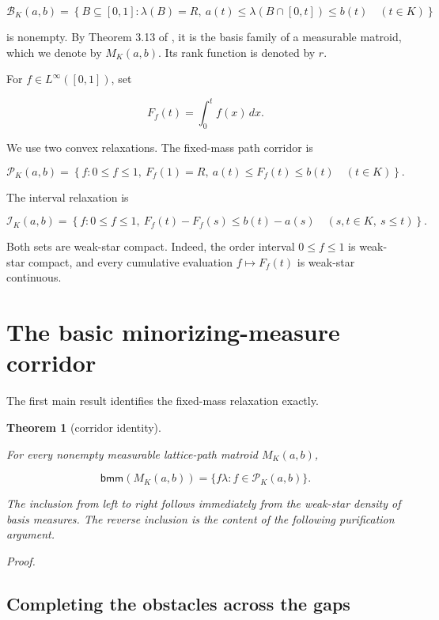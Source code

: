\documentclass[11pt]{article}
\newtheorem{theorem}{Theorem}[section]
\numberwithin{equation}{section}
\begin{document}
\nopagebreak[4]
\[
\mathcal B_K(a,b)
=\left\{B\subseteq[0,1]:
\lambda(B)=R,
\ a(t)\le\lambda(B\cap[0,t])\le b(t)\quad(t\in K)
\right\}
\]

is nonempty. By Theorem 3.13 of \cite{berczi2026}, it is the basis family of a measurable matroid,
which we denote by $M_K(a,b)$. Its rank function is denoted by $r$.

For $f\in L^\infty([0,1])$, set

\nopagebreak[4]
\[
F_f(t)=\int_0^t f(x)\,dx.
\]

We use two convex relaxations. The fixed-mass path corridor is

\nopagebreak[4]
\[
\mathcal P_K(a,b)
=\left\{f:
0\le f\le1,\ F_f(1)=R,
\ a(t)\le F_f(t)\le b(t)\quad(t\in K)
\right\}.
\]

The interval relaxation is

\nopagebreak[4]
\[
\mathcal I_K(a,b)
=\left\{f:
0\le f\le1,
\ F_f(t)-F_f(s)\le b(t)-a(s)
\quad(s,t\in K,\ s\le t)
\right\}.
\]

Both sets are weak-star compact. Indeed, the order interval $0\le f\le1$ is weak-star
compact, and every cumulative evaluation $f\mapsto F_f(t)$ is weak-star continuous.

\section{The basic minorizing-measure corridor}


The first main result identifies the fixed-mass relaxation exactly.

\begin{theorem}[corridor identity]
\label{thm:corridor}

For every nonempty measurable lattice-path matroid $M_K(a,b)$,

\nopagebreak[4]
\[
\mathsf{bmm}(M_K(a,b))
=\{f\lambda:f\in\mathcal P_K(a,b)\}.
\]

The inclusion from left to right follows immediately from the weak-star density of
basis measures. The reverse inclusion is the content of the following purification
argument.

\end{theorem}

\noindent\emph{Proof.}

\subsection{Completing the obstacles across the gaps}
\end{document}

